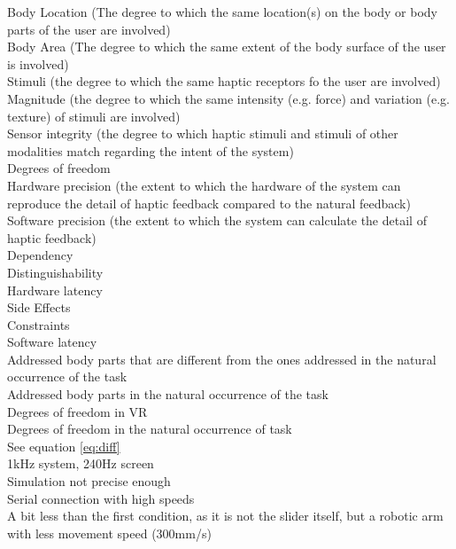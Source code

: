 \onecolumn
\tiny
\noindent
\footnotemark[1]Body Location (The degree to which the same location(s) on the body or body parts of the user are involved) \\
\footnotemark[2]Body Area (The degree to which the same extent of the body surface of the user is involved) \\
\footnotemark[3]Stimuli (the degree to which the same haptic receptors fo the user are involved) \\
\footnotemark[4]Magnitude (the degree to which the same intensity (e.g. force) and variation (e.g. texture) of stimuli are involved) \\
\footnotemark[5]Sensor integrity (the degree to which haptic stimuli and stimuli of other modalities match regarding the intent of the system) \\
\footnotemark[6]Degrees of freedom \\
\footnotemark[7]Hardware precision (the extent to which the hardware of the system can reproduce the detail of haptic feedback compared to the natural feedback) \\
\footnotemark[8]Software precision (the extent to which the system can calculate the detail of haptic feedback) \\
\footnotemark[9]Dependency \\
\footnotemark[10]Distinguishability \\
\footnotemark[11]Hardware latency \\
\footnotemark[12]Side Effects \\
\footnotemark[13]Constraints \\
\footnotemark[14]Software latency \\
\footnotemark[15]Addressed body parts that are different from the ones addressed in the natural occurrence of the task\\
\footnotemark[16]Addressed body parts in the natural occurrence of the task\\
\footnotemark[17]Degrees of freedom in VR\\
\footnotemark[18]Degrees of freedom in the natural occurrence of task\\
\footnotemark[19]See equation \ref{eq:diff}\\
\footnotemark[20]1kHz system, 240Hz screen \\
\footnotemark[21]Simulation not precise enough \\
\footnotemark[22]Serial connection with high speeds \\
\footnotemark[23]A bit less than the first condition, as it is not the slider itself, but a robotic arm with less movement speed (300mm/s) \\
